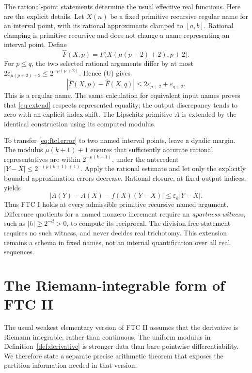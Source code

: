 \documentclass[11pt]{article}
\theoremstyle{definition}
\newcommand{\eps}{\varepsilon}
\newcommand{\abs}[1]{\left|#1\right|}
\begin{document}
The rational-point statements determine the usual effective real
functions.  Here are the explicit details.  Let \(X(n)\) be a fixed
primitive recursive regular name for an interval point, with its
rational approximants clamped to \([a,b]\).  Rational clamping is
primitive recursive and does not change a name representing an interval
point.  Define
\begin{equation}
 \widehat F(X,p)=F\bigl(X(\mu(p+2)+2),p+2\bigr).\label{eq:extend}
\end{equation}
For \(p\le q\), the two selected rational arguments differ by at most
\(2\eps_{\mu(p+2)+2}\le2^{-\mu(p+2)}\).  Hence (U) gives
\[
 \abs{\widehat F(X,p)-\widehat F(X,q)}
 \le2\eps_{p+2}+\eps_{q+2}.
\]
This is a regular name.  The same calculation for equivalent input
names proves that \eqref{eq:extend} respects represented equality;
the output discrepancy tends to zero with an explicit index shift.
The Lipschitz primitive \(A\) is extended by the identical construction
using its computed modulus.

To transfer \eqref{eq:ftc1error} to two named interval points, leave a
dyadic margin.  The modulus
\(\mu(k+1)+1\) ensures that sufficiently accurate rational
representatives are within \(2^{-\mu(k+1)}\), under the antecedent
\(\abs{Y-X}\le2^{-(\mu(k+1)+1)}\).  Apply the rational
estimate and let only the explicitly bounded approximation errors
decrease.  Rational closure, at fixed output indices, yields
\[
 \abs{A(Y)-A(X)-f(X)(Y-X)}\le\eps_k\abs{Y-X}.
\]
Thus FTC I holds at every admissible primitive recursive named argument.
Difference quotients for a named nonzero increment require an
\emph{apartness witness}, such as \(\abs h\ge2^{-d}>0\), to compute
its reciprocal.  The division-free statement requires no such
witness, and never decides real trichotomy.  This extension remains a
schema in fixed names, not an internal quantification over all real
sequences.

\section{The Riemann-integrable form of FTC II}\label{sec:generalFTC}

The usual weakest elementary version of FTC II assumes that the
derivative is Riemann integrable, rather than continuous.  The uniform
modulus in Definition~\ref{def:derivative} is stronger data than bare
pointwise differentiability.  We therefore state a separate precise
arithmetic theorem that exposes the partition information needed in
that version.
\end{document}
